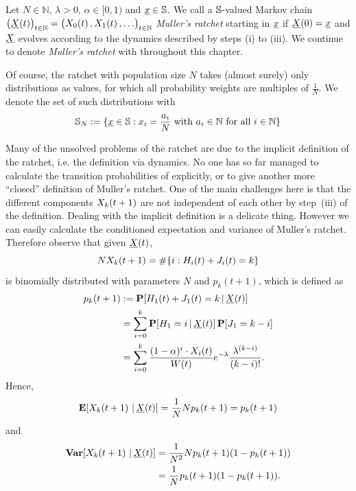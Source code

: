 \begin{Definition} \label{mr:def:mr}
Let $N \in \mathbb{N}$, $\lambda > 0$, $\alpha \in [0,1)$ and $\underline{x} \in
\mathbb{S}$. 
We call a $\mathbb{S}$-valued Markov chain 
$\big(\underline{X}\!\left(t\right)\!\big)_{t\in\mathbb{N}} = \big(X_{0} \! \left( t \right),X_{1} \! \left( t \right),\ldots \!\big)_{t\in\mathbb{N}}$ 
\emph{Muller's ratchet} starting in $\underline{x}$ if 
$\underline{X}\!\left(0\right) = \underline{x}$ and $\underline{X}$ evolves according to the dynamics described by
steps (i) to (iii). We continue to denote \emph{Muller's ratchet} with \mr throughout this
chapter.
\end{Definition}

\noindent
Of course, the ratchet with population size $N$ takes (almost surely) only
distributions as values, for which all probability weights are multiples of
$\frac{1}{N}$. We denote the set of such distributions with
\begin{align} \label{mr:eq:S_N}
\mathbb{S}_N := \{ \underline{x} \in \mathbb{S} : x_i = \frac{a_i}{N} \text{ with } a_i \in \mathbb{N} \text{
for all } i \in \mathbb{N} \}
\end{align}

\noindent
Many of the unsolved problems of the ratchet are due to the implicit definition of the ratchet, i.e.
the definition via dynamics. No one has so far managed to calculate the transition probabilities of
\mr explicitly, or to give another more ``closed'' definition of Muller's ratchet. One of the main
challenges here is that the different components $X_{k} \! \left( t+1 \right)$ are not independent of each other
by step~(iii) of the definition. Dealing with the implicit definition is a delicate thing. However we
can easily calculate the conditioned expectation and variance of Muller's ratchet. Therefore
observe that given $\underline{X}\!\left(t\right)$, \[ N X_{k} \! \left( t+1 \right) = \# \{ i :H_i(t)+J_i(t) = k \} \] 
is binomially distributed with parameters $N$ and $p_k(t+1)$, which is defined as
\begin{equation} \label{mr:eq:p_k}
\begin{aligned}
p_k(t+1) &:= \mathbf{P} \! \left[  H_1(t)+J_1(t)=k \, | \, \underline{X}\!\left(t\right)  \right] \\
&= \sum_{i=0}^k \mathbf{P} \! \left[  H_1 = i \, | \, \underline{X}\!\left(t\right)  \right] \mathbf{P} \! \left[ J_1=k-i \right]  \\ 
&= \sum_{i=0}^k \frac{(1-\alpha)^{i} \cdot X_{i} \! \left( t \right)}{W(t)} 
				 e^{-\lambda} \frac{\lambda^{(k-i)}}{(k-i)!}.
\end{aligned}
\end{equation}
Hence,
\begin{align} \label{mr:eq:expectation}
\mathbf{E} \! \left[  X_{k} \! \left( t+1 \right) \, | \, \underline{X}\!\left(t\right)  \right] = \frac{1}{N} N p_k(t+1) = p_k(t+1)
\end{align}
and
\begin{equation}
\begin{aligned} \label{mr:eq:variance}
\mathbf{Var} \! \left[  X_{k} \! \left( t+1 \right) \, | \, \underline{X}\!\left(t\right)  \right] 
&= \frac{1}{N^2} N p_k(t+1) (1-p_k(t+1)) \\
&=  \frac{1}{N} p_k(t+1) (1-p_k(t+1)).
\end{aligned}
\end{equation}

